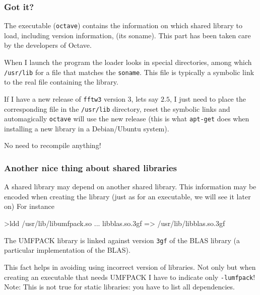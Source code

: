 \documentclass[9pt]{beamer}
\begin{document}
\begin{frame}
  \frametitle{Got it?}  

  The executable (\texttt{octave}) contains the
  information on which shared library to load, including version
  information, (its soname). This part has been taken care by the 
  developers of Octave.
  \smallskip

  When I launch the program the loader looks in special directories,
  among which \texttt{/usr/lib} for a file that matches the
  \texttt{soname}. This file is typically a symbolic link to the real
  file containing the library.  
\medskip

If I have a new release of \texttt{fftw3} version 3, lets say $2.5$,
I just need to place the corresponding file in the \texttt{/usr/lib}
directory, reset the symbolic links and automagically \texttt{octave}
will use the new release (this is what \texttt{apt-get} does when
installing a new library in a Debian/Ubuntu system).

  \smallskip

  No need to recompile anything!
\end{frame}


\begin{frame}
  \frametitle{Another nice thing about shared libraries} 

  A shared library may depend on another shared library. This information may be encoded  when creating the library
  (just as for an executable, we will see it later on)
  For instance
\begin{semiverbatim}
>ldd /usr/lib/libumfpack.so \newline
...\newline
libblas.so.3gf => /usr/lib/libblas.so.3gf
\end{semiverbatim}
The UMFPACK library is linked against version
\texttt{3gf} of the BLAS library (a particular implementation of the
BLAS). \smallskip

This fact helps in avoiding using incorrect version of
libraries. Not only but when creating an executable that needs UMFPACK I have to indicate only
\texttt{-lumfpack}! \alert{Note:} This is not true for static libraries: you have to list all dependencies.
\end{frame}
\end{document}
